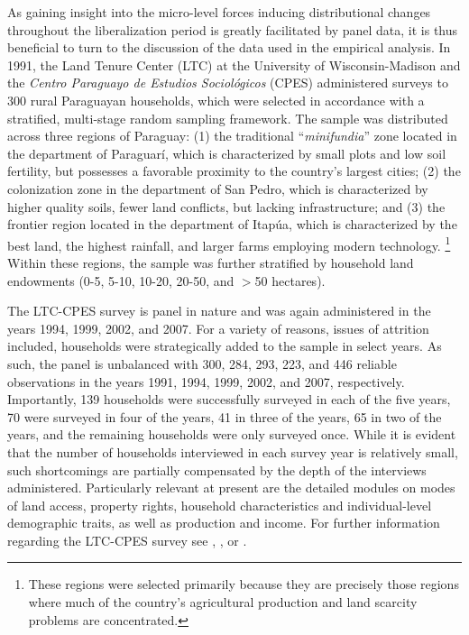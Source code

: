 \documentclass[english]{article}
\begin{document}
As gaining insight into the micro-level forces inducing distributional changes 
throughout the liberalization period is greatly facilitated by panel data, it is thus 
beneficial to turn to the discussion of the data used in the empirical analysis.
In 1991, the Land Tenure Center (LTC) at the University of 
Wisconsin-Madison and the \emph{Centro Paraguayo de Estudios 
Sociol\'{o}gicos} (CPES) administered surveys to 300 rural Paraguayan 
households, which were selected in accordance with a stratified, multi-stage 
random sampling framework. 
The sample was distributed across three regions of Paraguay: (1) the traditional 
``\emph{minifundia}'' zone located in the department of Paraguar\'{i}, 
which is characterized by small plots and low soil fertility, but possesses a 
favorable proximity to the country's largest cities; (2) the colonization zone in 
the department of San Pedro, which is characterized by higher quality soils, 
fewer land conflicts, but lacking infrastructure; and (3) the frontier region 
located in the department of Itap\'{u}a, which is characterized by the best 
land, the highest rainfall, and larger farms employing modern technology.%
\footnote{These regions were selected primarily because they are precisely 
those regions where much of the country's agricultural production and 
land scarcity problems are concentrated.}
Within these regions, the sample was further stratified by household land 
endowments (0-5, 5-10, 10-20, 20-50, and $>$50 hectares).

The LTC-CPES survey is panel in nature and was again administered in the 
years 1994, 1999, 2002, and 2007. 
For a variety of reasons, issues of attrition included, households were 
strategically added to the sample in select years.
As such, the panel is unbalanced with 300, 284, 293, 223, and 446 reliable 
observations in the years 1991, 1994, 1999, 2002, and 2007, respectively. 
Importantly, 139 households were successfully surveyed in each of the five 
years, 70 were surveyed in four of the years, 41 in three of the years, 65 in two 
of the years, and the remaining households were only surveyed once. 
While it is evident that the number of households interviewed in each survey 
year is relatively small, such shortcomings are partially compensated by the 
depth of the interviews administered. 
Particularly relevant at present are the detailed modules on modes of land 
access, property rights, household characteristics and individual-level 
demographic traits, as well as production and income. 
For further information regarding the LTC-CPES survey see 
\citet{fletschner2002}, \citet{carter2003}, or \citet{schechter2007}.
\end{document}
